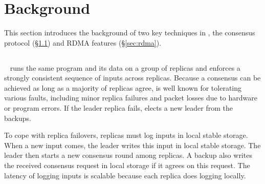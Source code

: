 \section{Background}\label{sec:background}

This section introduces the background of two key techniques in \xxx, the 
\paxos consensus protocol (\S\ref{sec:paxos}) and RDMA features 
(\S\ref{sec:rdma}).

\subsection{\paxos}\label{sec:paxos}
\paxos~\cite{paxos:complex,paxos,paxos:simple,paxos:live,paxos:fast,
paxos:practical} runs the same program and its data on a group of replicas 
and enforces a strongly consistent sequence of inputs across replicas. Because 
a consensus can be achieved as long as a majority of replicas agree, \paxos is 
well known for tolerating various faults, including minor replica failures 
and packet losses due to hardware or program errors. If the leader replica
fails, \paxos elects a new leader from the backups.

To cope with replica failovers, \paxos replicas must log inputs in local 
stable storage. When a new input comes, the \paxos leader writes this input in 
local stable storage. The leader then starts a new consensus round among 
replicas. A backup also writes the received consensus request in local storage 
if it agrees on this request. The latency of logging inputs is scalable 
because each replica does logging locally.



